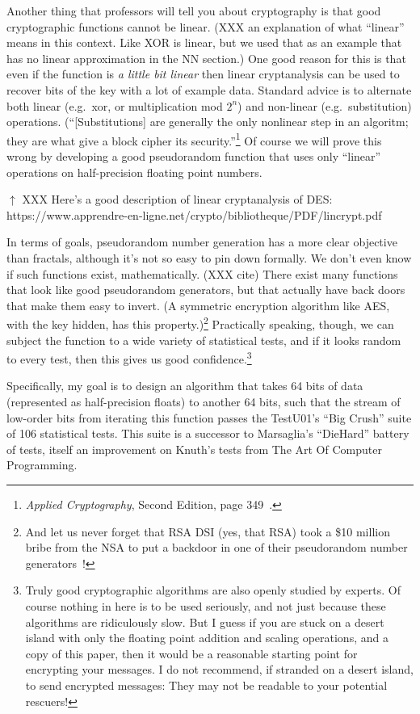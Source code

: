 \documentclass[twocolumn]{article}
\begin{document}
Another thing that professors will tell you about cryptography is that
good cryptographic functions cannot be linear. (XXX an explanation of
what ``linear'' means in this context. Like XOR is linear, but we used
that as an example that has no linear approximation in the NN
section.) One good reason for this is that even if the function is
{\em a little bit linear} then linear cryptanalysis can be used to recover
bits of the key with a lot of example data. Standard advice is to
alternate both linear (e.g.~xor, or multiplication mod $2^n$) and
non-linear (e.g.~substitution) operations. (``[Substitutions] are
generally the only nonlinear step in an algoritm; they are what give a
block cipher its security.''\footnote{{\it Applied Cryptography},
  Second Edition, page 349~\cite{schneier1996applied}.} Of course we
will prove this wrong by developing a good pseudorandom function that
uses only ``linear'' operations on half-precision floating point
numbers.

$\uparrow$ XXX Here's a good description of linear cryptanalysis of DES: https://www.apprendre-en-ligne.net/crypto/bibliotheque/PDF/lincrypt.pdf

In terms of goals, pseudorandom number generation has a more clear
objective than fractals, although it's not so easy to pin down
formally. We don't even know if such functions exist, mathematically.
(XXX cite) There exist many functions that look like good pseudorandom
generators, but that actually have back doors that make them easy to
invert. (A symmetric encryption algorithm like AES, with the key
hidden, has this property.)\footnote{And let us never forget that RSA
  DSI (yes, that RSA) took a \$10 million bribe from the NSA to put a
  backdoor in one of their pseudorandom number
  generators~\cite{reuters2013secret}!} Practically speaking, though,
we can subject the function to a wide variety of statistical tests,
and if it looks random to every test, then this gives us good
confidence.\footnote{Truly good cryptographic algorithms are also
  openly studied by experts. Of course nothing in here is to be used
  seriously, and not just because these algorithms are ridiculously
  slow. But I guess if you are stuck on a desert island with only the
  floating point addition and scaling operations, and a copy of this
  paper, then it would be a reasonable starting point for encrypting
  your messages. I do not recommend, if stranded on a desert island,
  to send encrypted messages: They may not be readable to your
  potential rescuers!}

Specifically, my goal is to design an algorithm that takes 64 bits of
data (represented as half-precision floats) to another 64 bits, such
that the stream of low-order bits from iterating this function passes
the TestU01's ``Big Crush'' suite of 106 statistical
tests\cite{lecuyer2007testu01}. This suite is a successor to
Marsaglia's ``DieHard'' battery of tests\cite{marsaglia1996diehard},
itself an improvement on Knuth's tests from The Art Of Computer
Programming\cite{knuth1997art}.
\end{document}
